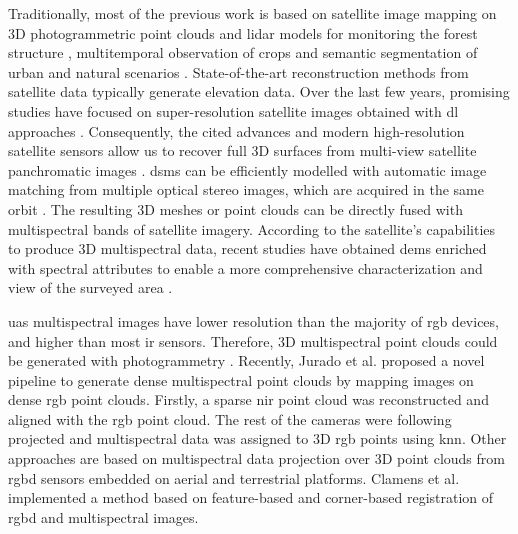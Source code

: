 Traditionally, most of the previous work is based on satellite image mapping on 3D photogrammetric point clouds and \acrshort{lidar} models for monitoring the forest structure \cite{bolton_optimizing_2020, lechner_applications_2020}, multitemporal observation of crops \cite{gadiraju_multimodal_2020, qadeer_spatio-temporal_2021} and semantic segmentation of urban and natural scenarios \cite{ballouch_toward_2022, saralioglu_semantic_2020}. State-of-the-art reconstruction methods from satellite data typically generate elevation data. Over the last few years, promising studies have focused on super-resolution satellite images obtained with \acrshort{dl} approaches \cite{gomez_experimental_2022, stucker_resdepth_2022}. Consequently, the cited advances and modern high-resolution satellite sensors allow us to recover full 3D surfaces from multi-view satellite panchromatic images \cite{han_state_2020, rothermel_photometric_2020}. \acrshort{dsm}s can be efficiently modelled with automatic image matching from multiple optical stereo images, which are acquired in the same orbit \cite{gui_automated_2021, qin_critical_2019}. The resulting 3D meshes or point clouds can be directly fused with multispectral bands of satellite imagery. According to the satellite's capabilities to produce 3D multispectral data, recent studies have obtained \acrshort{dem}s enriched with spectral attributes to enable a more comprehensive characterization and view of the surveyed area \cite{dalponte_mapping_2020, sagan_field-scale_2021, wang_extraction_2020}. 

\acrshort{uas} multispectral images have lower resolution than the majority of \acrshort{rgb} devices, and higher than most \acrshort{ir} sensors. Therefore, 3D multispectral point clouds could be generated with photogrammetry \cite{liu_registration_2018, zainuddin_3d_2019, shen_estimation_2019, villacres_construction_2022, comba_unsupervised_2018}. Recently, Jurado et al. \cite{jurado_multispectral_2020} proposed a novel pipeline to generate dense multispectral point clouds by mapping images on dense \acrshort{rgb} point clouds. Firstly, a sparse \acrshort{nir} point cloud was reconstructed and aligned with the \acrshort{rgb} point cloud. The rest of the cameras were following projected and multispectral data was assigned to 3D \acrshort{rgb} points using \acrshort{knn}. Other approaches are based on multispectral data projection over 3D point clouds from \acrshort{rgbd} sensors embedded on aerial and terrestrial platforms. Clamens et al. \cite{clamens_real-time_2021} implemented a method based on feature-based and corner-based registration of \acrshort{rgbd} and multispectral images.

